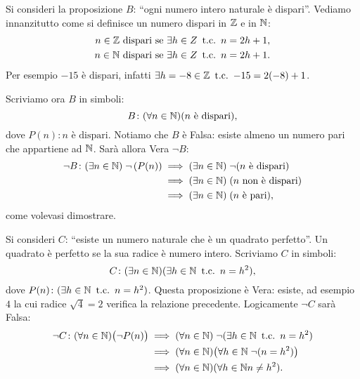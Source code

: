 \begin{example}
    Si consideri la proposizione \(B\): ``ogni numero intero naturale è dispari''. Vediamo innanzitutto come si definisce un numero dispari in \(\mathbb{Z}\) e in \(\mathbb{N}\):
    \begin{alignat*}{1}
        n \in \mathbb{Z} \text{ dispari se } &\exists h \in Z \mathrm{\hspace*{.5em}t.c.\hspace*{.5em}} n = 2h + 1, \\
        n \in \mathbb{N} \text{ dispari se } &\exists h \in Z \mathrm{\hspace*{.5em}t.c.\hspace*{.5em}} n = 2h + 1.
    \end{alignat*}
    Per esempio \(-15\) è dispari, infatti \(\exists h = -8 \in \mathbb{Z} \mathrm{\hspace*{.5em}t.c.\hspace*{.5em}} {-}15 = 2(-8) + 1\).

    Scriviamo ora \(B\) in simboli:
    \[
        B\colon (\forall n \in \mathbb{N}) (n \text{ è dispari}),
    \]
    dove \(P(n)\colon n \text{ è dispari}\). Notiamo che \(B\) è Falsa: esiste almeno un numero pari che appartiene ad \(\mathbb{N}\). Sarà allora Vera \(\neg B\):
    \begin{alignat*}{1}
        \neg B\colon (\exists n \in \N)\; \neg \left(P(n)\right)%
            &\implies (\exists n \in \N)\; \neg (n \text{ è dispari}) \\
            &\implies (\exists n \in \N)\; (n \text{ non è dispari}) \\
            &\implies (\exists n \in \N)\; (n \text{ è pari}),
    \end{alignat*}
    come volevasi dimostrare.
\end{example}

\begin{example}
    Si consideri \(C\): ``esiste un numero naturale che è un quadrato perfetto''. Un quadrato è perfetto se la sua radice è numero intero. Scriviamo \(C\) in simboli:
    \[
        C\colon (\exists n \in \mathbb{N}) (\exists h \in \mathbb{N} \mathrm{\hspace*{.5em}t.c.\hspace*{.5em}} n = h^2),
    \]
    dove \(P(n)\colon (\exists h \in \mathbb{N} \mathrm{\hspace*{.5em}t.c.\hspace*{.5em}} n = h^2)\). Questa proposizione è Vera: esiste, ad esempio \(4\) la cui radice \(\sqrt{4} = 2\) verifica la relazione precedente.
    Logicamente \(\neg C\) sarà Falsa:
    \begin{alignat*}{1}
        \neg C\colon (\forall n \in \N) \big(\neg P(n)\big)%
            &\implies (\forall n \in \N)\; \neg (\exists h \in \N \tc n = h^2) \\
            &\implies (\forall n \in \N) \big(\forall h \in \N\; \neg (n = h^2)\big) \\
            &\implies (\forall n \in \N) (\forall h \in \N n \neq h^2).
    \end{alignat*}
\end{example}

